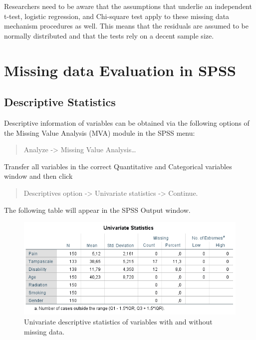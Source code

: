 \documentclass[
]{book}
\begin{document}
Researchers need to be aware that the assumptions that underlie an
independent t-test, logistic regression, and Chi-square test apply to
these missing data mechanism procedures as well. This means that the
residuals are assumed to be normally distributed and that the tests rely
on a decent sample size.

\hypertarget{missing-data-evaluation-in-spss}{%
\section{Missing data Evaluation in
SPSS}\label{missing-data-evaluation-in-spss}}

\hypertarget{descriptive-statistics}{%
\subsection{Descriptive Statistics}\label{descriptive-statistics}}

Descriptive information of variables can be obtained via the following
options of the Missing Value Analysis (MVA) module in the SPSS menu:

\begin{quote}
Analyze -\textgreater{} Missing Value Analysis\ldots{}
\end{quote}

Transfer all variables in the correct Quantitative and Categorical
variables window and then click

\begin{quote}
Descriptives option -\textgreater{} Univariate statistics
-\textgreater{} Continue.
\end{quote}

The following table will appear in the SPSS Output window.

\begin{figure}

{\centering \includegraphics[width=0.9\linewidth]{images/tab2.4} 

}

\caption{Univariate descriptive statistics of variables with and without missing data.}\label{fig:tab2-4}
\end{figure}
\end{document}
